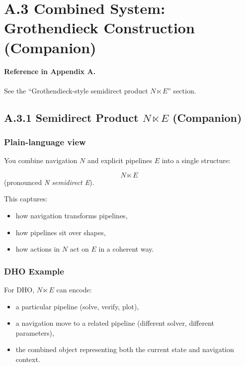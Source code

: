 \newpage

\section{A.3 Combined System: Grothendieck Construction (Companion)}

\paragraph{Reference in Appendix A.}
See the ``Grothendieck-style semidirect product $N \ltimes E$'' section.

\subsection{A.3.1 Semidirect Product $N \ltimes E$ (Companion)}

\subsubsection*{Plain-language view}

You combine navigation $N$ and explicit pipelines $E$ into a single structure:

\[
N \ltimes E
\]
(pronounced \emph{N semidirect E}).

This captures:

\begin{itemize}
 \item how navigation transforms pipelines,
 \item how pipelines sit over shapes,
 \item how actions in $N$ act on $E$ in a coherent way.
\end{itemize}

\subsubsection*{DHO Example}

For DHO, $N \ltimes E$ can encode:

\begin{itemize}
 \item a particular pipeline (solve, verify, plot),
 \item a navigation move to a related pipeline (different solver, different parameters),
 \item the combined object representing both the current state and navigation context.
\end{itemize}

